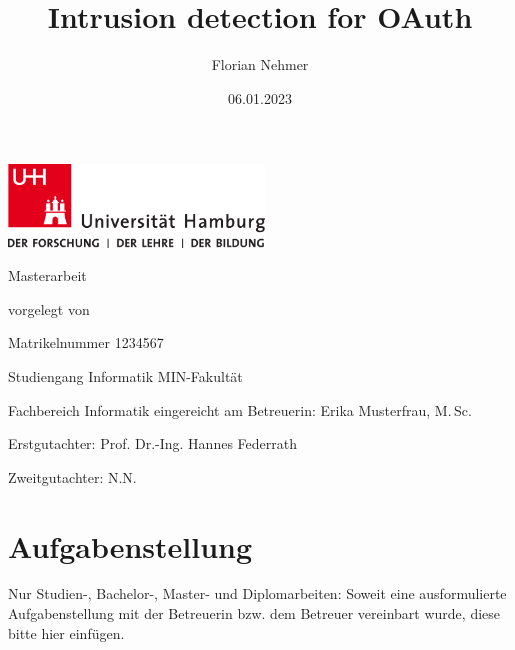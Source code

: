 \documentclass[
    fontsize=12pt,
    headings=small,
    parskip=half,           %
    bibliography=totoc,
    numbers=noenddot,       %
    open=any,               %
    ]{scrreprt}
\title{Intrusion detection for OAuth}
\author{Florian Nehmer}
\date{06.01.2023} %
\begin{document}
\begin{titlepage}%
	\includegraphics[width=6.8cm]{./pic/up-uhh-logo-u-2010-u-farbe-u-rgb.pdf}
	\begin{center}\Large
		\vfill
		Masterarbeit
		\vfill
		\makeatletter
		{\Large\textsf{\textbf{\@title}}\par}
		\makeatother
		\vfill
		vorgelegt von
		\par\bigskip
		\makeatletter
		{\@author} \par
		\makeatother
		Matrikelnummer 1234567 \par
		Studiengang Informatik
		\vfill
		MIN-Fakultät \par
		Fachbereich Informatik
		\vfill
		\makeatletter
		eingereicht am {\@date}
		\makeatother
		\vfill
		Betreuerin: Erika Musterfrau, M.\,Sc. \par
		Erstgutachter: Prof. Dr.-Ing. Hannes Federrath \par
		Zweitgutachter: N.N.
	\end{center}
\end{titlepage}%

\chapter*{Aufgabenstellung}

Nur Studien-, Bachelor-, Master- und Diplomarbeiten: Soweit eine ausformulierte Aufgabenstellung mit der Betreuerin bzw. dem Betreuer vereinbart wurde, diese bitte hier einfügen.
\end{document}
